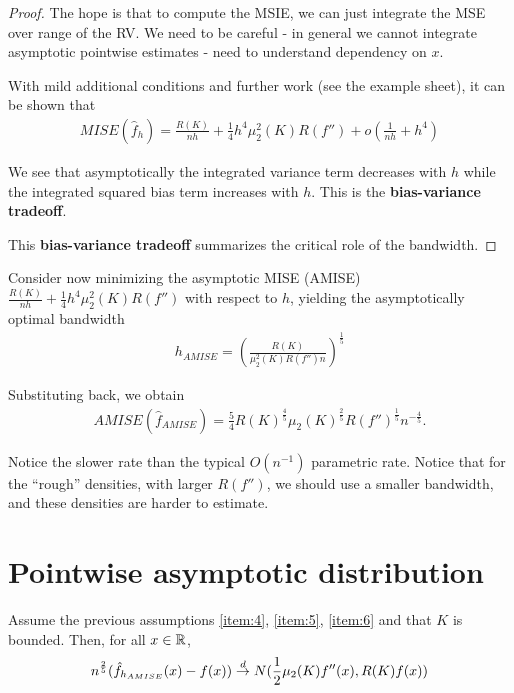 \begin{proof}
The hope is that to compute the MSIE, we can just integrate the MSE
over range of the RV.  We need to be careful - in general we cannot
integrate asymptotic pointwise estimates - need to understand
dependency on $x$.

With mild additional conditions and further work (see the example
sheet), it can be shown that
\begin{align}
  \label{eq:23}
  MISE(\hat f_{h})= \frac{R(K)}{nh} + \frac{1}{4} h^{4}
  \mu_{2}^{2}(K)R(f'') + o(\frac{1}{nh} + h^{4})
\end{align}

We see that asymptotically the integrated variance term decreases with
$h$ while the integrated squared bias term increases with $h$.  This
is the \textbf{bias-variance tradeoff}.

This \textbf{bias-variance tradeoff} summarizes the critical role of
the bandwidth.

\end{proof}

Consider now minimizing the asymptotic MISE (AMISE) $\frac{R(K)}{nh} +
\frac{1}{4} h^{4} \mu_{2}^{2}(K) R(f'')$ with respect to $h$, yielding
the asymptotically optimal bandwidth
\begin{align}
  \label{eq:24}
  h_{AMISE} = (\frac{R(K)}{\mu_{2}^{2}(K) R(f'') n})^{\frac{1}{5}}
\end{align}

Substituting back, we obtain
\begin{align}
  \label{eq:25}
  AMISE(\hat f_{AMISE}) = \frac{5}{4} R(K)^{\frac{4}{5}}
  \mu_{2}(K)^{\frac{2}{5}} R(f'')^{\frac{1}{5}} n^{-\frac{4}{5}}.
\end{align}

Notice the slower rate than the typical $O(n^{-1})$
parametric rate.  Notice that for the ``rough'' densities, with larger
$R(f'')$, we should use a smaller bandwidth, and these densities are
harder to estimate.


\section{Pointwise asymptotic distribution}
\label{sec:pointw-asympt-distr}

\begin{thm}
  \label{defn:Introduction:4}
  Assume the previous assumptions \ref{item:4}, \ref{item:5},
  \ref{item:6} and that $K$ is bounded.  Then, for all $x \in \mathbb{R}$,
  \begin{equation}
    \label{eq:26}
    n^{\frac{2}{5}}(\hat f_{h_{AMISE}}(x) - f(x)) \overset{d}{\rightarrow}
    N(\frac{1}{2}\mu_{2}(K) f''(x), R(K) f(x))
  \end{equation}
\end{thm}

